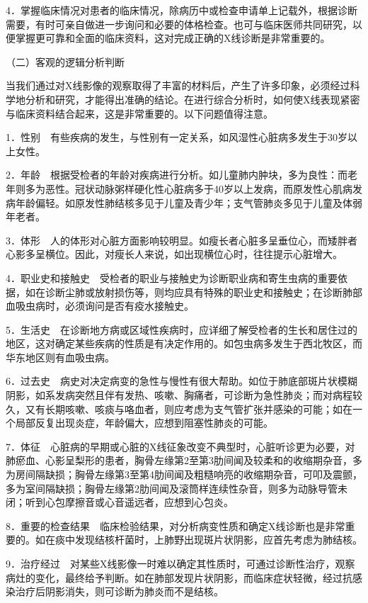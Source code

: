 4．掌握临床情况对患者的临床情况，除病历中或检查申请单上记载外，根据诊断需要，有时可亲自做进一步询问和必要的体格检查。也可与临床医师共同研究，以便掌握更可靠和全面的临床资料，这对完成正确的X线诊断是非常重要的。

（二）客观的逻辑分析判断

当我们通过对X线影像的观察取得了丰富的材料后，产生了许多印象，必须经过科学地分析和研究，才能得出准确的结论。在进行综合分析时，如何使X线表现紧密与临床资料结合起来，这是非常重要的。以下问题值得注意。

1．性别　有些疾病的发生，与性别有一定关系，如风湿性心脏病多发生于30岁以上女性。

2．年龄　根据受检者的年龄对疾病进行分析。如儿童肺内肿块，多为良性：而老年则多为恶性。冠状动脉粥样硬化性心脏病多于40岁以上发病，而原发性心肌病发病年龄偏轻。如原发性肺结核多见于儿童及青少年；支气管肺炎多见于儿童及体弱年老者。

3．体形　人的体形对心脏方面影响较明显。如瘦长者心脏多呈垂位心，而矮胖者心影多呈横位。因此，对瘦长人来说，如出现横位心时，往往提示心脏增大。

4．职业史和接触史　受检者的职业与接触史为诊断职业病和寄生虫病的重要依据，如在诊断尘肺或放射损伤等，则均应具有特殊的职业史和接触史；在诊断肺部血吸虫病时，必须询问是否有疫水接触史。

5．生活史　在诊断地方病或区域性疾病时，应详细了解受检者的生长和居住过的地区，这对确定某些疾病的性质是有决定作用的。如包虫病多发生于西北牧区，而华东地区则有血吸虫病。

6．过去史　病史对决定病变的急性与慢性有很大帮助。如位于肺底部斑片状模糊阴影，如系发病突然且伴有发热、咳嗽、胸痛者，可诊断为急性肺炎；而对病程较久，又有长期咳嗽、咳痰与咯血者，则应考虑为支气管扩张并感染的可能；如在一个局部反复出现炎症，年龄偏大，应想到阻塞性肺炎的可能。

7．体征　心脏病的早期或心脏的X线征象改变不典型时，心脏听诊更为必要，对肺瘀血、心影呈梨形的患者，胸骨左缘第2至第3肋间闻及较柔和的收缩期杂音，多为房间隔缺损；胸骨左缘第3至第4肋间闻及粗糙响亮的收缩期杂音，可叩及震颤，多为室间隔缺损；胸骨左缘第2肋间闻及滚筒样连续性杂音，则多为动脉导管未闭；听到心包摩擦音或心音遥远者，应想到心包炎。

8．重要的检查结果　临床检验结果，对分析病变性质和确定X线诊断也是非常重要的。如在痰中发现结核杆菌时，上肺野出现斑片状阴影，应首先考虑为肺结核。

9．治疗经过　对某些X线影像一时难以确定其性质时，可通过诊断性治疗，观察病灶的变化，最终给予判断。如在肺部发现片状阴影，而临床症状轻微，经过抗感染治疗后阴影消失，则可诊断为肺炎而不是结核。

